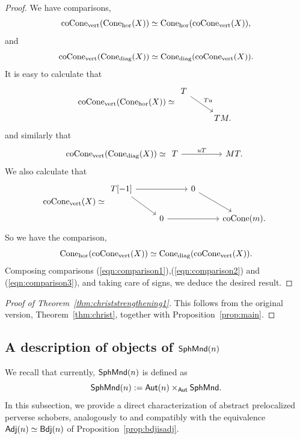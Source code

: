 \begin{proof}
    We have comparisons,
    \begin{equation}\label{eqn:comparison1}
        \operatorname{coCone}_{\operatorname{vert}}(\operatorname{Cone}_{\operatorname{hor}}(X))\simeq\operatorname{Cone}_{\operatorname{hor}}(\operatorname{coCone}_{\operatorname{vert}}(X)),
    \end{equation}
    and
    \begin{equation}\label{eqn:comparison2}
        \operatorname{coCone}_{\operatorname{vert}}(\operatorname{Cone}_{\operatorname{diag}}(X))\simeq\operatorname{Cone}_{\operatorname{diag}}(\operatorname{coCone}_{\operatorname{vert}}(X)).
    \end{equation}
    It is easy to calculate that
    \[\coCone_{\ver}(\Cone_{\hor}(X))\simeq\begin{tikzcd}
        T & \\
        & TM.
        \arrow["Tu", from=1-1, to=2-2]
    \end{tikzcd}\]
    and similarly that
    \[\coCone_{\ver}(\Cone_{\dia}(X))\simeq
    \begin{tikzcd}
        T && MT.
        \arrow["uT", from=1-1, to=1-3]
    \end{tikzcd}\]
    We also calculate that
    \[\coCone_{\ver}(X)\simeq\begin{tikzcd}
        {T[-1]} && 0 & \\
        & 0 && {\coCone(m)}.
        \arrow[from=1-1, to=1-3]
        \arrow[from=1-1, to=2-2]
        \arrow[from=1-3, to=2-4]
        \arrow[from=2-2, to=2-4]
    \end{tikzcd}\]
    So we have the comparison,
    \begin{equation}\label{eqn:comparison3}
        \operatorname{Cone}_{\operatorname{hor}}(\operatorname{coCone}_{\operatorname{vert}}(X))\simeq\operatorname{Cone}_{\operatorname{diag}}(\operatorname{coCone}_{\operatorname{vert}}(X)).
    \end{equation}
    Composing comparisons (\ref{eqn:comparison1}),(\ref{eqn:comparison2}) and (\ref{eqn:comparison3}), and taking care of signs, we deduce the desired result.
\end{proof}

\begin{proof}[Proof of Theorem~\ref{thm:christstrengthening1}]
    This follows from the original version, Theorem~\ref{thm:christ}, together with Proposition~\ref{prop:main}.
\end{proof}

\subsection{A description of objects of \texorpdfstring{$\mathsf{SphMnd}(n)$}{SphMnd(n)}}\label{subsection:sphmonad}
We recall that currently, $\mathsf{SphMnd}(n)$ is defined as
\[\mathsf{SphMnd}(n) := \mathsf{Aut}(n)\times_{\mathsf{Aut}}\mathsf{SphMnd}.\]
In this subsection, we provide a direct characterization of abstract prelocalized perverse schobers, analogously to and compatibly with the equivalence $\mathsf{Adj}(n)\simeq\mathsf{Bdj}(n)$ of Proposition~\ref{prop:bdjisadj}.

